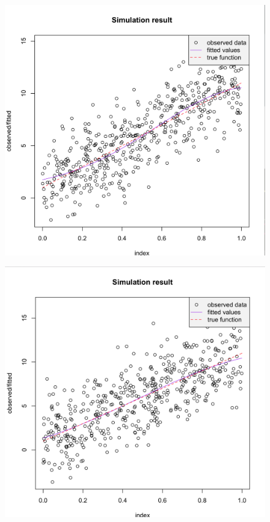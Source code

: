 \documentclass[11pt]{article}
\begin{document}
    \begin{figure}
    \centering
    \begin{minipage}{.5\textwidth}
      \centering
      \includegraphics[width=.4\linewidth]{GP_noRE.png}
      \label{fig:test1}
    \end{minipage}%
    \begin{minipage}{.5\textwidth}
      \centering
      \includegraphics[width=.4\linewidth]{GP_normalRE_linear}
      \label{fig:test2}
    \end{minipage}
  \end{figure}
\end{document}
